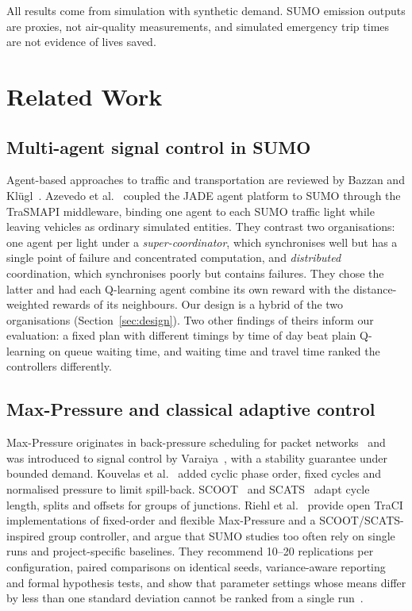 \documentclass[conference]{IEEEtran}
\begin{document}
All results come from simulation with synthetic demand. SUMO emission outputs are proxies,
not air-quality measurements, and simulated emergency trip times are not evidence of lives
saved.

\section{Related Work}

\subsection{Multi-agent signal control in SUMO}
Agent-based approaches to traffic and transportation are reviewed by Bazzan and
Kl\"ugl~\cite{bazzan2014review}. Azevedo et al.~\cite{azevedo2016jade} coupled the JADE
agent platform to SUMO through the TraSMAPI middleware, binding one agent to each SUMO
traffic light while leaving vehicles as ordinary simulated entities. They contrast two
organisations: one agent per light under a \emph{super-coordinator}, which synchronises
well but has a single point of failure and concentrated computation, and \emph{distributed}
coordination, which synchronises poorly but contains failures. They chose the latter and
had each Q-learning agent combine its own reward with the distance-weighted rewards of its
neighbours. Our design is a hybrid of the two organisations (Section~\ref{sec:design}).
Two other findings of theirs inform our evaluation: a fixed plan with different timings by
time of day beat plain Q-learning on queue waiting time, and waiting time and travel time
ranked the controllers differently.

\subsection{Max-Pressure and classical adaptive control}
Max-Pressure originates in back-pressure scheduling for packet networks~\cite{tassiulas1990stability}
and was introduced to signal control by Varaiya~\cite{varaiya2013maxpressure}, with a
stability guarantee under bounded demand. Kouvelas et al.~\cite{kouvelas2014maxpressure}
added cyclic phase order, fixed cycles and normalised pressure to limit spill-back.
SCOOT~\cite{hunt1981scoot} and SCATS~\cite{lowrie1990scats} adapt cycle length, splits and
offsets for groups of junctions. Riehl et al.~\cite{riehl2026sumoitscontrol} provide
open TraCI implementations of fixed-order and flexible Max-Pressure and a
SCOOT/SCATS-inspired group controller, and argue that SUMO studies too often rely on
single runs and project-specific baselines. They recommend 10--20 replications per
configuration, paired comparisons on identical seeds, variance-aware reporting and formal
hypothesis tests, and show that parameter settings whose means differ by less than one
standard deviation cannot be ranked from a single run~\cite{riehl2026sumoitscontrol,riehl2025reproducibility}.
\end{document}
